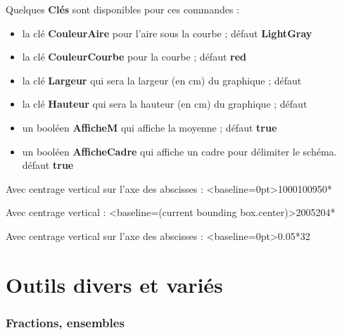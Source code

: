 \documentclass{article}
\newcommand\Cle[1]{{\bfseries\sffamily\textlangle #1\textrangle}}
\begin{document}
\begin{codecles}
Quelques \Cle{Clés} sont disponibles pour ces commandes :

\begin{itemize}
	\item la clé \Cle{CouleurAire} pour l'aire sous la courbe ; \hfill{}défaut \Cle{LightGray}
	\item la clé \Cle{CouleurCourbe} pour la courbe ; \hfill{}défaut \Cle{red}
	\item la clé \Cle{Largeur} qui sera la largeur (en cm) du graphique ; \hfill{}défaut \Cle{2}
	\item la clé \Cle{Hauteur} qui sera la hauteur (en cm) du graphique ; \hfill{}défaut \Cle{1}
	\item un booléen \Cle{AfficheM} qui affiche la moyenne ; \hfill{}défaut \Cle{true}
	\item un booléen \Cle{AfficheCadre} qui affiche un cadre pour délimiter le schéma. \hfill{}défaut \Cle{true}
\end{itemize}
\end{codecles}

\begin{codetex}
Avec centrage vertical sur l'axe des abscisses :
\LoiNormaleGraphe[AfficheM=false,CouleurCourbe=Blue,CouleurAire=LightBlue]<baseline=0pt>{1000}{100}{950}{*}

\medskip


\medskip

Avec centrage vertical :
\LoiNormaleGraphe[Largeur=5,Hauteur=2.5]<baseline=(current bounding box.center)>{200}{5}{204}{*}

\medskip

Avec centrage vertical sur l'axe des abscisses :
\LoiExpoGraphe[AfficheM=false,CouleurCourbe=Blue,CouleurAire=LightBlue]<baseline=0pt>{0.05}{*}{32}

\medskip

\end{codetex}

\newpage

\part{Outils divers et variés}

\section{Fractions, ensembles}
\end{document}
